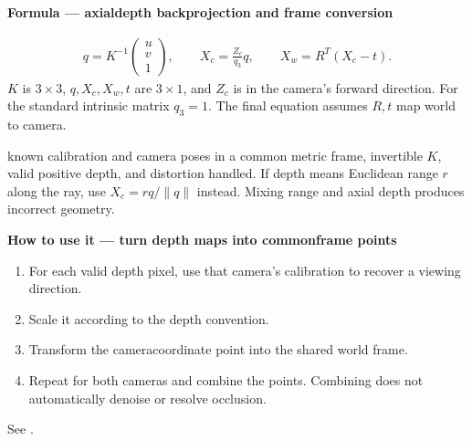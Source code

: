 \documentclass[letterpaper,11pt,english,openany,oneside]{jupyterBook}
\begin{document}
\begin{TextbookBox}
\textbf{Formula — axial\sphinxhyphen{}depth backprojection and frame conversion}\par\smallskip
\begin{equation}\label{equation:lectures/lecture01/cameras:eq-lec01-backproject}
\begin{split}q=K^{-1}\begin{pmatrix}u\\v\\1\end{pmatrix},\qquad
X_c=\frac{Z_c}{q_3}q,\qquad
X_w=R^T(X_c-t).\end{split}
\end{equation}
\sphinxAtStartPar
\(K\) is \(3\times3\), \(q,X_c,X_w,t\) are \(3\times1\), and \(Z_c\) is  in the camera’s forward direction. For the standard intrinsic matrix \(q_3=1\). The final equation assumes \(R,t\) map world to camera.

\sphinxAtStartPar
{} known calibration and camera poses in a common metric frame, invertible \(K\), valid positive depth, and distortion handled. If depth means Euclidean range \(r\) along the ray, use \(X_c=rq/\|q\|\) instead. Mixing range and axial depth produces incorrect geometry.

\end{TextbookBox}

\begin{TextbookBox}
\textbf{How to use it — turn depth maps into common\sphinxhyphen{}frame points}\par\smallskip
\begin{enumerate}
%
\item {}
\sphinxAtStartPar
For each valid depth pixel, use that camera’s calibration to recover a viewing direction.

\item {}
\sphinxAtStartPar
Scale it according to the depth convention.

\item {}
\sphinxAtStartPar
Transform the camera\sphinxhyphen{}coordinate point into the shared world frame.

\item {}
\sphinxAtStartPar
Repeat for both cameras and combine the points. Combining does not automatically denoise or resolve occlusion.

\end{enumerate}

\sphinxAtStartPar
See {\hyperref[\detokenize{lectures/lecture01/quiz-workbook:ex-lec01-depth}]{}}.

\end{TextbookBox}
\end{document}
